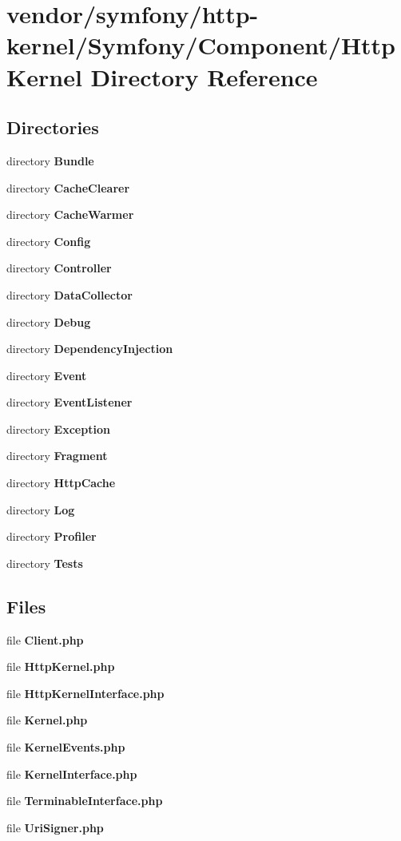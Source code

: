 \section{vendor/symfony/http-\/kernel/\+Symfony/\+Component/\+Http\+Kernel Directory Reference}
\label{dir_30c878831da62fce15922b84032f7263}
\subsection*{Directories}
\begin{DoxyCompactItemize}
\item 
directory {\bf Bundle}
\item 
directory {\bf Cache\+Clearer}
\item 
directory {\bf Cache\+Warmer}
\item 
directory {\bf Config}
\item 
directory {\bf Controller}
\item 
directory {\bf Data\+Collector}
\item 
directory {\bf Debug}
\item 
directory {\bf Dependency\+Injection}
\item 
directory {\bf Event}
\item 
directory {\bf Event\+Listener}
\item 
directory {\bf Exception}
\item 
directory {\bf Fragment}
\item 
directory {\bf Http\+Cache}
\item 
directory {\bf Log}
\item 
directory {\bf Profiler}
\item 
directory {\bf Tests}
\end{DoxyCompactItemize}
\subsection*{Files}
\begin{DoxyCompactItemize}
\item 
file {\bf Client.\+php}
\item 
file {\bf Http\+Kernel.\+php}
\item 
file {\bf Http\+Kernel\+Interface.\+php}
\item 
file {\bf Kernel.\+php}
\item 
file {\bf Kernel\+Events.\+php}
\item 
file {\bf Kernel\+Interface.\+php}
\item 
file {\bf Terminable\+Interface.\+php}
\item 
file {\bf Uri\+Signer.\+php}
\end{DoxyCompactItemize}
